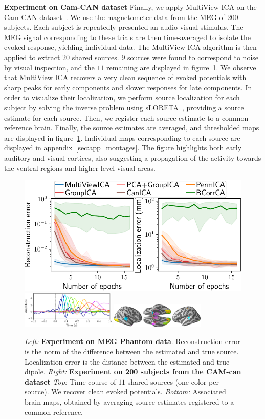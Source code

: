 \textbf{Experiment on Cam-CAN dataset}
Finally, we apply MultiView ICA on the Cam-CAN dataset~\cite{taylor2017cambridge}. We use the magnetometer data from the MEG of $200$ subjects.
%
Each subject is repeatedly presented an audio-visual stimulus. 
%
The MEG signal corresponding to these trials are then time-averaged to isolate the evoked response, yielding individual data.
%
The MultiView ICA algorithm is then applied to extract $20$ shared sources.
%
$9$ sources were found to correspond to noise by visual inspection, and the $11$ remaining are displayed in figure~\ref{fig:meg}.
%
We observe that MultiView ICA recovers a very clean sequence of evoked potentials with sharp peaks
for early components and slower responses for late components.
%
In order to visualize their localization, we perform source localization for each subject by solving the inverse problem using sLORETA~\cite{pascual2002standardized}, providing a source estimate for each source.
%
Then, we register each source estimate to a common reference brain.
%
Finally, the source estimates are averaged, and thresholded maps are displayed in figure~\ref{fig:meg}.
%
Individual maps corresponding to each source are displayed in appendix~\ref{sec:app_montages}.
The figure highlights both early auditory and visual cortices, also suggesting a propagation
of the activity towards the ventral regions and higher level visual areas.

\begin{figure}
    \centering

          \includegraphics[width=0.4\linewidth]{figures/mvica/phantom_new.pdf}
          \includegraphics[width=0.4\textwidth]{figures/mvica/camcan_sources.pdf}
          \includegraphics[width=0.4\textwidth]{figures/mvica/montage_all.png}
    \caption{\emph{Left:} \textbf{Experiment on MEG Phantom data}. Reconstruction error is the norm of the difference between the estimated and true source. Localization error is the distance between the estimated and true dipole. \emph{Right:} \textbf{Experiment on 200 subjects from the CAM-can dataset} \emph{Top:} Time course of $11$ shared sources (one color per source). We recover clean evoked potentials. \emph{Bottom:} Associated brain maps, obtained by averaging source estimates registered to a common reference.}
    \label{fig:meg}
\end{figure}

